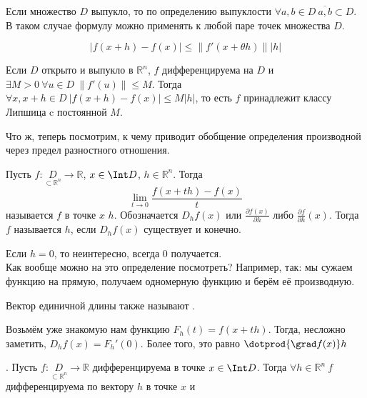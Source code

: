 \documentclass{article}
\begin{document}
\begin{itemize}
        \begin{Comment}
            Если множество $D$ выпукло, то по определению выпуклости $\forall a,b\in D~\overline{a,b}\subset D$. В таком случае формулу можно применять к любой паре точек множества $D$.
        \end{Comment}
        \begin{Comment}
            $$|f(x+h)-f(x)|\leqslant\|f'(x+\theta h)\||h|$$
        \end{Comment}
        \begin{Comment}
            Если $D$ открыто и выпукло в $\mathbb R^n$, $f$ дифференцируема на $D$ и $\exists M>0~\forall u\in D~\|f'(u)\|\leqslant M$. Тогда $\forall x,x+h\in D~|f(x+h)-f(x)|\leqslant M|h|$, то есть $f$ принадлежит классу Липшица c постоянной $M$.
        \end{Comment}
        \begin{Comment}
            Что ж, теперь посмотрим, к чему приводит обобщение определения производной через предел разностного отношения.
        \end{Comment}
        \dfn Пусть $f\colon\underset{\subset\mathbb R^n}D\to\mathbb R$, $x\in\Int D$, $h\in\mathbb R^n$. Тогда
        $$
        \lim\limits_{t\to0}\frac{f(x+th)-f(x)}t
        $$
        называется  $f$ в точке $x$  $h$. Обозначается $D_hf(x)$ или $\frac{\partial f(x)}{\partial h}$ либо $\frac{\partial f}{\partial h}(x)$. Тогда $f$ называется  $h$, если $D_hf(x)$ существует и конечно.
        \begin{Comment}
            Если $h=0$, то неинтересно, всегда $0$ получается.\\
            Как вообще можно на это определение посмотреть? Например, так: мы сужаем функцию на прямую, получаем одномерную функцию и берём её производную.
        \end{Comment}
        \dfn Вектор единичной длины также называют .
        \begin{Comment}
            Возьмём уже знакомую нам функцию $F_h(t)=f(x+th)$. Тогда, несложно заметить, $D_hf(x)=F_h'(0)$. Более того, это равно $\dotprod{\grad f(x)}h$
        \end{Comment}
        \thm {}. Пусть $f\colon\underset{\subset\mathbb R^n}D\to\mathbb R$ дифференцируема в точке $x\in\Int D$. Тогда
        $\forall h\in\mathbb R^n~f$ дифференцируема по вектору $h$ в точке $x$ и

\end{itemize}
\end{document}
